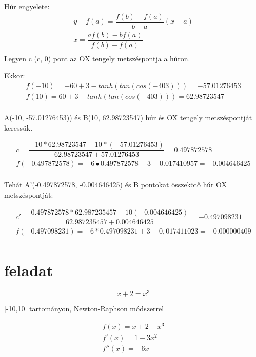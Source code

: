 \documentclass{article}
\begin{document}
Húr engyelete:
\begin{multline}
y-f(a)=\dfrac{f(b)-f(a)}{b-a}(x-a)\\
x=\dfrac{af(b)-bf(a)}{f(b)-f(a)}\\
\end{multline}
Legyen c (c, 0) pont az OX tengely metszéspontja a húron.

Ekkor:
\begin{multline}
f(-10)=-60+3-tanh(tan(cos(-403))) = -57.01276453\\
f(10) = 60+3-tanh(tan(cos(-403))) = 62.98723547\\
\end{multline}

A(-10, -57.01276453)) és B(10, 62.98723547) húr és OX tengely metszéspontját keressük.

\begin{multline}
c = \dfrac{-10*62.98723547-10*(-57.01276453)}{62.98723547+57.01276453} =0.497872578\\
f(-0.497872578) = -6 \dot{•} 0.497872578 + 3 -0.017410957 = -0.004646425\\
\end{multline}

Tehát A'(-0.497872578, -0.004646425) és B pontokat összekötő húr OX metszéspontját:

\begin{multline}
c' = \dfrac{0.497872578*62.987235457-10(-0.004646425)}{62.987235457 + 0.004646425} = -0.497098231\\
f(-0.497098231) = -6*0.497098231+3-0,017411023 = -0.000000409\\
\end{multline}


\section{feladat}
\begin{equation}
x+2 = x^{3}
\end{equation}

[-10,10] tartományon, Newton-Raphson módszerrel

\begin{multline}
f(x) = x+2 - x^{3}\\
f'(x) = 1-3x^{2}\\
f''(x)=-6x\\
\end{multline}
\end{document}
